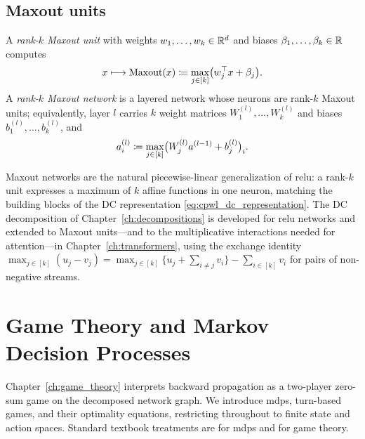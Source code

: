 \subsection*{Maxout units}

\begin{definition}\label{def:maxout}
A \emph{rank-$k$ Maxout unit} with weights $w_1, \ldots, w_k \in \mathbb{R}^{d}$ and biases $\beta_1, \ldots, \beta_k \in \mathbb{R}$ computes
\begin{equation}
	x \longmapsto \text{Maxout}(x) \coloneqq \max_{j \in [k]} \bigl( w_j^{\top} x + \beta_j \bigr).
	\label{eq:maxout_unit}
\end{equation}
A \emph{rank-$k$ Maxout network} is a layered network whose neurons are rank-$k$ Maxout units; equivalently, layer $l$ carries $k$ weight matrices $W^{(l)}_1, \ldots, W^{(l)}_k$ and biases $b^{(l)}_1, \ldots, b^{(l)}_k$, and
\begin{equation}
	a^{(l)}_i \coloneqq \max_{j \in [k]} \bigl( W^{(l)}_j a^{(l-1)} + b^{(l)}_j \bigr)_i .
	\label{eq:maxout_layer}
\end{equation}
\end{definition}

\begin{remark}\label{rem:maxout_role}
Maxout networks are the natural piecewise-linear generalization of \ac{relu}: a rank-$k$ unit expresses a maximum of $k$ affine functions in one neuron, matching the building blocks of the DC representation \eqref{eq:cpwl_dc_representation}. The DC decomposition of Chapter~\ref{ch:decompositions} is developed for \ac{relu} networks and extended to Maxout units---and to the multiplicative interactions needed for attention---in Chapter~\ref{ch:transformers}, using the exchange identity $\max_{j \in [k]}(u_j - v_j) = \max_{j \in [k]}\bigl\{ u_j + \sum_{i \ne j} v_i \bigr\} - \sum_{i \in [k]} v_i$ for pairs of non-negative streams.
\end{remark}

\section{Game Theory and Markov Decision Processes}\label{sec:game_theory_mdp_foundations}

Chapter~\ref{ch:game_theory} interprets backward propagation as a two-player zero-sum game on the decomposed network graph. We introduce \acp{mdp}, turn-based games, and their optimality equations, restricting throughout to finite state and action spaces. Standard textbook treatments are \textcite{Puterman1994mdp} for \acp{mdp} and \textcite{OsborneRubinstein1994} for game theory.

